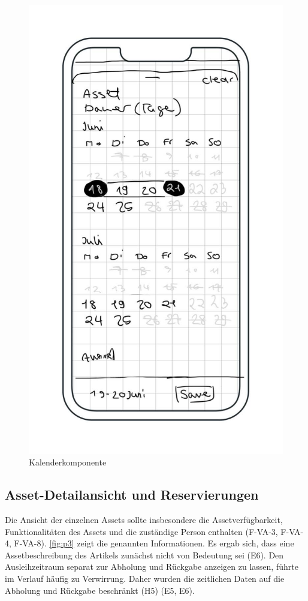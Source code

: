 \begin{figure}[h]
    \centering
    \includegraphics[scale=0.4]{Bilder/Mockups/Kalender.jpg}\hspace{2em}
    \caption[Kalenderkomponente]{Kalenderkomponente}
    \label{fig:kalender}
\end{figure}

\subsection{Asset-Detailansicht und Reservierungen}
Die Ansicht der einzelnen Assets sollte insbesondere die Assetverfügbarkeit,
Funktionalitäten des Assets und die zuständige Person enthalten (F-VA-3, F-VA-4, F-VA-8).
\ref{fig:p3} zeigt die genannten Informationen. Es ergab sich, dass eine
Assetbeschreibung des Artikels zunächst nicht von Bedeutung sei (E6). Den
Ausleihzeitraum separat zur Abholung und Rückgabe anzeigen zu lassen, führte im
Verlauf häufig zu Verwirrung. Daher wurden die zeitlichen Daten auf die Abholung
und Rückgabe beschränkt (H5) (E5, E6).


